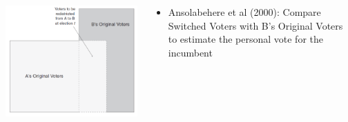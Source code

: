\documentclass[xcolor=x11names,compress]{beamer}\usepackage[]{graphicx}\usepackage[]{color}
\renewcommand{\(}{\begin{columns}}
\renewcommand{\)}{\end{columns}}
\newcommand{\<}[1]{\begin{column}{#1}}
\renewcommand{\>}{\end{column}}
\begin{document}
\begin{frame}
\begin{columns}
\begin{column}{0.6\textwidth}
\includegraphics[scale=0.38]{Sekhon_redistricting_a.png}
\end{column}
\begin{column}{0.4\textwidth}
\begin{itemize}
\item Ansolabehere et al (2000): Compare Switched Voters with B's Original Voters to estimate the personal vote for the incumbent
\end{itemize}
\end{column}
\end{columns}
\end{frame}
\end{document}
